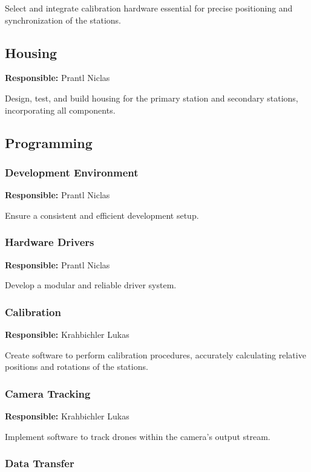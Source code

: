 Select and integrate calibration hardware essential for precise positioning and synchronization of the stations.

\subsection{Housing}

\textbf{Responsible:} Prantl Niclas

Design, test, and build housing for the primary station and secondary stations, incorporating all components.

\subsection{Programming}

\subsubsection{Development Environment}

\textbf{Responsible:} Prantl Niclas

Ensure a consistent and efficient development setup.

\subsubsection{Hardware Drivers}

\textbf{Responsible:} Prantl Niclas

Develop a modular and reliable driver system.

\subsubsection{Calibration}

\textbf{Responsible:} Krahbichler Lukas

Create software to perform calibration procedures, accurately calculating relative positions and rotations of the stations.

\subsubsection{Camera Tracking}

\textbf{Responsible:} Krahbichler Lukas

Implement software to track drones within the camera's output stream.

\subsubsection{Data Transfer}

